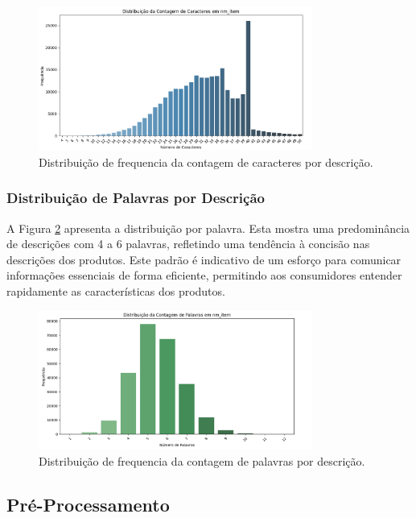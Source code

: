 \begin{figure}[H]
    \centering
    \includegraphics[width=0.8\textwidth]{images/distcaracteres.png}
    \caption{Distribuição de frequencia da contagem de caracteres por descrição.}
    \label{fig:distcaracteres}
\end{figure}

\subsubsection{Distribuição de Palavras por Descrição}
A Figura \ref{fig:distpalavras} apresenta a distribuição por palavra. Esta mostra uma predominância de descrições com 4 a 6 palavras, refletindo uma tendência à concisão nas descrições dos produtos. Este padrão é indicativo de um esforço para comunicar informações essenciais de forma eficiente, permitindo aos consumidores entender rapidamente as características dos produtos.

\begin{figure}[H]
    \centering
    \includegraphics[width=0.8\textwidth]{images/distpalavrass.png}
    \caption{Distribuição de frequencia da contagem de palavras por descrição.}
    \label{fig:distpalavras}
\end{figure}

\subsection{Pré-Processamento}

